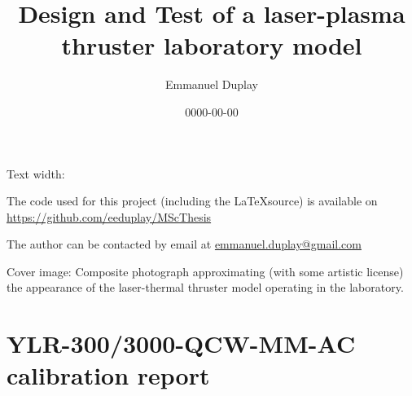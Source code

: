 \documentclass[11pt,a4paper]{report}
\title{Design and Test of a laser-plasma thruster laboratory model}
\author{Emmanuel Duplay}
\date{0000-00-00}
\begin{document}
    \setlength{\parindent}{0pt}
    \setlength{\headheight}{13.6pt}
    
    

    \newpage
    {   \sffamily
        \thispagestyle{empty}
        \vspace*{\fill}
        Text width: \the\textwidth  %

        The code used for this project (including the \LaTeX\hspace{0.67ex}source) is available on \\ \url{https://github.com/eeduplay/MScThesis}

        The author can be contacted by email at \href{mailto:emmanuel.duplay@gmail.com}{emmanuel.duplay@gmail.com}

        Cover image: Composite photograph approximating (with some artistic license) the appearance of the laser-thermal thruster model operating in the laboratory.
    }

    
    \hypersetup{linkcolor=black}
    \tableofcontents
    
    \listoffigures
    
    \listoftables
    \hypersetup{linkcolor=cyan}
    
    

    \newpage
    

    \newpage

    
    
    
    
    
    
    
    \clearpage
    \printbibliography[
        heading=bibintoc,
        title={References},
        block=ragged,
        prenote=bibmark
        ]
    \newpage

    \appendix
    \newcommand{\footeronly}{\thispagestyle{fancy}\markboth{}{}}
    \chapter{YLR-300/3000-QCW-MM-AC calibration report}
        \label{chp:app_YLR}
        
\end{document}
